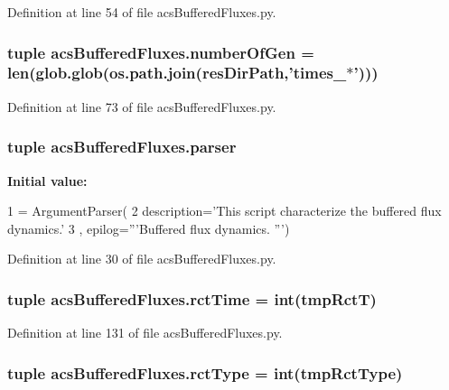 Definition at line 54 of file acs\-Buffered\-Fluxes.\-py.

\hypertarget{a00098_acd3059fa3a61438f739193dc80f23b80}{
\subsubsection[{number\-Of\-Gen}]{\setlength{\rightskip}{0pt plus 5cm}tuple acs\-Buffered\-Fluxes.\-number\-Of\-Gen = len(glob.\-glob(os.\-path.\-join({\bf res\-Dir\-Path},'times\-\_\-$\ast$')))}}\label{a00098_acd3059fa3a61438f739193dc80f23b80}


Definition at line 73 of file acs\-Buffered\-Fluxes.\-py.

\hypertarget{a00098_adba84e3872cb47cad219837458e56677}{
\subsubsection[{parser}]{\setlength{\rightskip}{0pt plus 5cm}tuple acs\-Buffered\-Fluxes.\-parser}}\label{a00098_adba84e3872cb47cad219837458e56677}
{\bfseries Initial value\-:}
\begin{DoxyCode}
1 = ArgumentParser(
2                                 description=\textcolor{stringliteral}{'This script characterize the buffered flux dynamics.'}
3                                 , epilog=\textcolor{stringliteral}{'''Buffered flux dynamics. '''})
\end{DoxyCode}


Definition at line 30 of file acs\-Buffered\-Fluxes.\-py.

\hypertarget{a00098_a8bce447521fd3dec6adb8f7603f8ea4e}{
\subsubsection[{rct\-Time}]{\setlength{\rightskip}{0pt plus 5cm}tuple acs\-Buffered\-Fluxes.\-rct\-Time = int(tmp\-Rct\-T)}}\label{a00098_a8bce447521fd3dec6adb8f7603f8ea4e}


Definition at line 131 of file acs\-Buffered\-Fluxes.\-py.

\hypertarget{a00098_a154a987096ec19ec5944920f52003171}{
\subsubsection[{rct\-Type}]{\setlength{\rightskip}{0pt plus 5cm}tuple acs\-Buffered\-Fluxes.\-rct\-Type = int(tmp\-Rct\-Type)}}\label{a00098_a154a987096ec19ec5944920f52003171}


